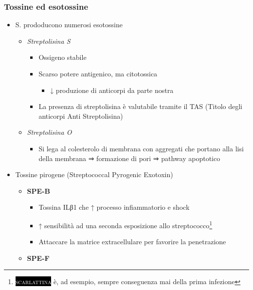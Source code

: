 \documentclass[italian,]{article}
\providecommand{\tightlist}{%
  \setlength{\itemsep}{0pt}\setlength{\parskip}{0pt}}
\newcommand{\pat}[1]{\colorbox{black}{\textcolor{white}{\textsc{#1}}}}
\begin{document}
\hypertarget{tossine-ed-esotossine}{%
\subsubsection{Tossine ed esotossine}\label{tossine-ed-esotossine}}

\begin{itemize}
\tightlist
\item
  S. prododucono numerosi esotossine

  \begin{itemize}
  \tightlist
  \item
    \emph{Streptolisina S}

    \begin{itemize}
    \tightlist
    \item
      Ossigeno stabile
    \item
      Scarso potere antigenico, ma citotossica

      \begin{itemize}
      \tightlist
      \item
        ↓ produzione di anticorpi da parte nostra
      \end{itemize}
    \item
      La presenza di streptolisina è valutabile tramite il TAS (Titolo
      degli anticorpi Anti Streptolisina)
    \end{itemize}
  \item
    \emph{Streptolisina O}

    \begin{itemize}
    \tightlist
    \item
      Si lega al colesterolo di membrana con aggregati che portano alla
      lisi della membrana ⇒ formazione di pori ⇒ pathway apoptotico
    \end{itemize}
  \end{itemize}
\item
  Tossine pirogene (Streptococcal Pyrogenic Exotoxin)

  \begin{itemize}
  \tightlist
  \item
    \textbf{SPE-B}

    \begin{itemize}
    \tightlist
    \item
      Tossina ILβ1 che ↑ processo infiammatorio e shock
    \item
      ↑ sensibilità ad una seconda esposizione allo
      streptococco\footnote{\pat{scarlattina} è, ad esempio, sempre
        conseguenza mai della prima infezione}
    \item
      Attaccare la matrice extracellulare per favorire la penetrazione
    \end{itemize}
  \item
    \textbf{SPE-F}


\end{itemize}
\end{itemize}
\end{document}
